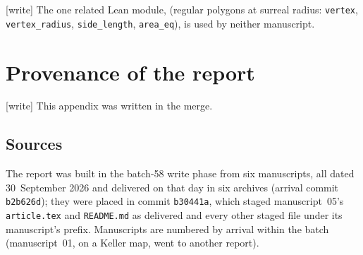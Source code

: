 \documentclass[11pt,a4paper]{article}
\numberwithin{equation}{section}
\theoremstyle{plain}
\newcommand{\wtag}{\textup{[write]}}%
\begin{document}
\wtag{} The one related Lean module, 
(regular polygons at surreal radius: \texttt{vertex}, \texttt{vertex\_radius},
\texttt{side\_length}, \texttt{area\_eq}), is used by neither manuscript.


\appendix
\section{Provenance of the report}\label{poly:app:provenance}

\noindent\wtag{} This appendix was written in the merge.

\subsection{Sources}

The report was built in the batch-58 write phase from six manuscripts,
all dated 30~September 2026 and delivered on that day in six archives
(arrival commit \texttt{b2b626d}); they were placed in commit
\texttt{b30441a}, which staged manuscript~05's \nolinkurl{article.tex} and
\nolinkurl{README.md} as delivered and every other staged file under its
manuscript's prefix. Manuscripts are numbered by arrival within the batch
(manuscript~01, on a Keller map, went to another report).
\end{document}
